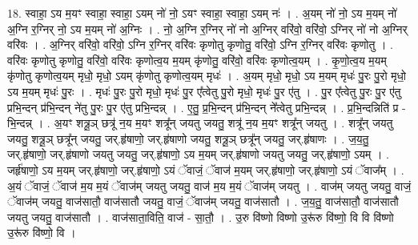 \documentclass[17pt]{extarticle}
\begin{document}
18. स्वाहा॒ ऽय म॒यꣳ स्वाहा॒ स्वाहा॒ ऽयम् नो॑ नो॒ ऽयꣳ स्वाहा॒ स्वाहा॒ ऽयम् नः॑ । . अ॒यम् नो॑ नो॒ ऽय म॒यम् नो॑ अ॒ग्नि र॒ग्निर् नो॒ ऽय म॒यम् नो॑ अ॒ग्निः । . नो॒ अ॒ग्नि र॒ग्निर् नो॑ नो अ॒ग्निर् वरि॑वो॒ वरि॑वो॒ ऽग्निर् नो॑ नो अ॒ग्निर् वरि॑वः । . अ॒ग्निर् वरि॑वो॒ वरि॑वो॒ ऽग्नि र॒ग्निर् वरि॑वः कृणोतु कृणोतु॒ वरि॑वो॒ ऽग्नि र॒ग्निर् वरि॑वः कृणोतु । . वरि॑वः कृणोतु कृणोतु॒ वरि॑वो॒ वरि॑वः कृणोत्व॒य म॒यम् कृ॑णोतु॒ वरि॑वो॒ वरि॑वः कृणोत्व॒यम् । . कृ॒णो॒त्व॒य म॒यम् कृ॑णोतु कृणोत्व॒यम् मृधो॒ मृधो॒ ऽयम् कृ॑णोतु कृणोत्व॒यम् मृधः॑ । . अ॒यम् मृधो॒ मृधो॒ ऽय म॒यम् मृधः॑ पु॒रः पु॒रो मृधो॒ ऽय म॒यम् मृधः॑ पु॒रः । . मृधः॑ पु॒रः पु॒रो मृधो॒ मृधः॑ पु॒र ए᳚त्वेतु पु॒रो मृधो॒ मृधः॑ पु॒र ए॑तु । . पु॒र ए᳚त्वेतु पु॒रः पु॒र ए॑तु प्रभि॒न्दन् प्र॑भि॒न्दन् ने॑तु पु॒रः पु॒र ए॑तु प्रभि॒न्दन्न् । . ए॒तु॒ प्र॒भि॒न्दन् प्र॑भि॒न्दन् ने᳚त्वेतु प्रभि॒न्दन्न् । . प्र॒भि॒न्दन्निति॑ प्र - भि॒न्दन्न् । . अ॒यꣳ शत्रू॒ञ् छत्रू॑ न॒य म॒यꣳ शत्रू᳚न् जयतु जयतु॒ शत्रू॑ न॒य म॒यꣳ शत्रू᳚न् जयतु । . शत्रू᳚न् जयतु जयतु॒ शत्रू॒ञ् छत्रू᳚न् जयतु॒ जर्.हृ॑षाणो॒ जर्.हृ॑षाणो जयतु॒ शत्रू॒ञ् छत्रू᳚न् जयतु॒ जर्.हृ॑षाणः । . ज॒य॒तु॒ जर्.हृ॑षाणो॒ जर्.हृ॑षाणो जयतु जयतु॒ जर्.हृ॑षाणो॒ ऽय म॒यम् जर्.हृ॑षाणो जयतु जयतु॒ जर्.हृ॑षाणो॒ ऽयम् । . जर्हृ॑षाणो॒ ऽय म॒यम् जर्.हृ॑षाणो॒ जर्.हृ॑षाणो॒ ऽयं ॅवाजं॒ ॅवाज॑ म॒यम् जर्.हृ॑षाणो॒ जर्.हृ॑षाणो॒ ऽयं ॅवाज᳚म् । . अ॒यं ॅवाजं॒ ॅवाज॑ म॒य म॒यं ॅवाज॑म् जयतु जयतु॒ वाज॑ म॒य म॒यं ॅवाज॑म् जयतु । . वाज॑म् जयतु जयतु॒ वाजं॒ ॅवाज॑म् जयतु॒ वाज॑सातौ॒ वाज॑सातौ जयतु॒ वाजं॒ ॅवाज॑म् जयतु॒ वाज॑सातौ । . ज॒य॒तु॒ वाज॑सातौ॒ वाज॑सातौ जयतु जयतु॒ वाज॑सातौ । . वाज॑साता॒विति॒ वाज॑ - सा॒तौ॒ । . उ॒रु वि॑ष्णो विष्णो उ॒रू॑रु वि॑ष्णो॒ वि वि वि॑ष्णो उ॒रू॑रु वि॑ष्णो॒ वि । \newline
\end{document}

